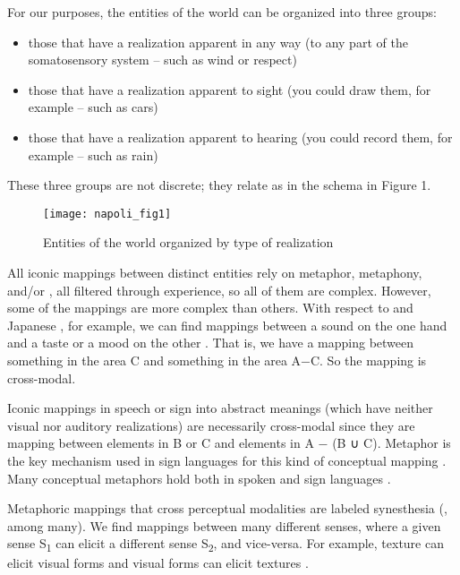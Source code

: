 \documentclass[output=paper,
modfonts
]{LSP/langsci}
\begin{document}
For our purposes, the entities of the world can be organized into three
groups:

\begin{itemize}
\item
  those that have a realization apparent in any way (to any part of the
  somatosensory system -- such as wind or respect)
\item
  those that have a realization apparent to sight (you could draw them,
  for example -- such as cars)
\item
  those that have a realization apparent to hearing (you could record
  them, for example -- such as rain)
\end{itemize}

These three groups are not discrete; they relate as in the schema in
Figure 1.

\begin{figure}
\texttt{[image: napoli\_fig1]}
\caption{Entities of the world organized by type of
realization}
\label{fig:1n}
\end{figure}

All iconic mappings between distinct entities rely on metaphor,
metaphony, and/or , all filtered through experience, so all of
them are complex. However, some of the mappings are more complex than
others. With respect to  and Japanese , for example, we
can find mappings between a sound on the one hand and a taste or a mood
on the other \citep{garrigues1995,iwasaki2013}. That is, we have a
mapping between something in the area C and something in the area A−C.
So the mapping is cross-modal.

Iconic mappings in speech or sign into abstract meanings (which have neither visual nor auditory realizations) are necessarily
cross-modal since they are mapping between elements in B or C and
elements in A − (B ∪ C). Metaphor is the key mechanism used in sign
languages for this kind of conceptual mapping \citep{borghi2014}. Many
conceptual metaphors hold both in spoken and sign languages \citep{roush2016}.

Metaphoric mappings that cross perceptual modalities are labeled
synesthesia (\citealt{cytowic1989}, among many). We find mappings between many
different senses, where a given sense S\textsubscript{1} can elicit a
different sense S\textsubscript{2}, and vice-versa. For example, texture
can elicit visual forms \citep{simner2012,ludwig2013} and visual forms can elicit textures \citep{albertazzi2016}.
\end{document}
